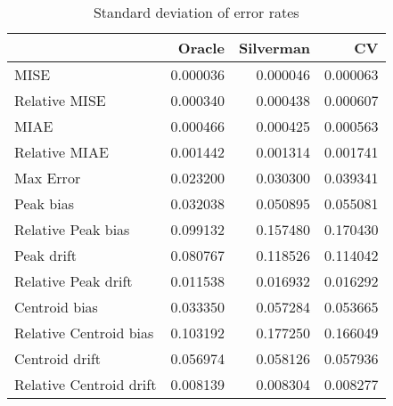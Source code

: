 \begin{table}[ht]
\centering
\begin{tabular}{lrrr}
  \hline
 & Oracle & Silverman & CV \\ 
  \hline
MISE & 0.000036 & 0.000046 & 0.000063 \\ 
  Relative MISE & 0.000340 & 0.000438 & 0.000607 \\ 
  MIAE & 0.000466 & 0.000425 & 0.000563 \\ 
  Relative MIAE & 0.001442 & 0.001314 & 0.001741 \\ 
  Max Error & 0.023200 & 0.030300 & 0.039341 \\ 
  Peak bias & 0.032038 & 0.050895 & 0.055081 \\ 
  Relative Peak bias & 0.099132 & 0.157480 & 0.170430 \\ 
  Peak drift & 0.080767 & 0.118526 & 0.114042 \\ 
  Relative Peak drift & 0.011538 & 0.016932 & 0.016292 \\ 
  Centroid bias & 0.033350 & 0.057284 & 0.053665 \\ 
  Relative Centroid bias & 0.103192 & 0.177250 & 0.166049 \\ 
  Centroid drift & 0.056974 & 0.058126 & 0.057936 \\ 
  Relative Centroid drift & 0.008139 & 0.008304 & 0.008277 \\ 
   \hline
\end{tabular}
\caption{Standard deviation of error rates} 
\label{tbl:stddev_error_rates}
\end{table}
